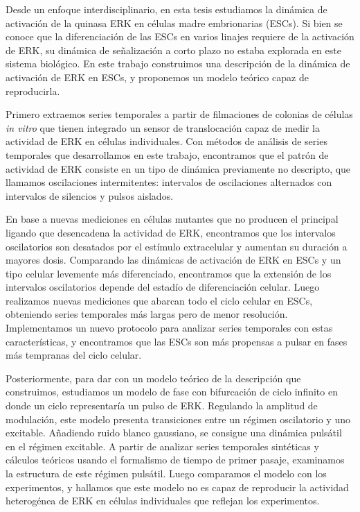 \documentclass[./main.tex]{subfiles}
\begin{document}

Desde un enfoque interdisciplinario, en esta tesis estudiamos la dinámica de activación de la quinasa ERK en células madre embrionarias (ESCs). Si bien se conoce que la diferenciación de las ESCs en varios linajes requiere de la activación de ERK, su dinámica de señalización a corto plazo no estaba explorada en este sistema biológico. En este trabajo construimos una descripción de la dinámica de activación de ERK en ESCs, y proponemos un modelo teórico capaz de reproducirla. 

Primero extraemos series temporales a partir de filmaciones de colonias de células \textit{in vitro} que tienen integrado un sensor de translocación capaz de medir la actividad de ERK en células individuales. Con métodos de análisis de series temporales que desarrollamos en este trabajo, encontramos que el patrón de actividad de ERK consiste en un tipo de dinámica previamente no descripto, que llamamos oscilaciones intermitentes: intervalos de oscilaciones alternados con intervalos de silencios y pulsos aislados. 

En base a nuevas mediciones en células mutantes que no producen el principal ligando que desencadena la actividad de ERK, encontramos que los intervalos oscilatorios son desatados por el estímulo extracelular y aumentan su duración a mayores dosis. Comparando las dinámicas de activación de ERK en ESCs y un tipo celular levemente más diferenciado, encontramos que la extensión de los intervalos oscilatorios depende del estadío de diferenciación celular. Luego realizamos nuevas mediciones que abarcan todo el ciclo celular en ESCs, obteniendo series temporales más largas pero de menor resolución. Implementamos un nuevo protocolo para analizar series temporales con estas características, y encontramos que las ESCs son más propensas a pulsar en fases más tempranas del ciclo celular.

Posteriormente, para dar con un modelo teórico de la descripción que construimos, estudiamos un modelo de fase con bifurcación de ciclo infinito en donde un ciclo representaría un pulso de ERK. Regulando la amplitud de modulación, este modelo presenta transiciones entre un régimen oscilatorio y uno excitable. Añadiendo ruido blanco gaussiano, se consigue una dinámica pulsátil en el régimen excitable. A partir de analizar series temporales sintéticas y cálculos teóricos usando el formalismo de tiempo de primer pasaje, examinamos la estructura de este régimen pulsátil. Luego comparamos el modelo con los experimentos, y hallamos que este modelo no es capaz de reproducir la actividad heterogénea de ERK en células individuales que reflejan los experimentos. 
\end{document}
